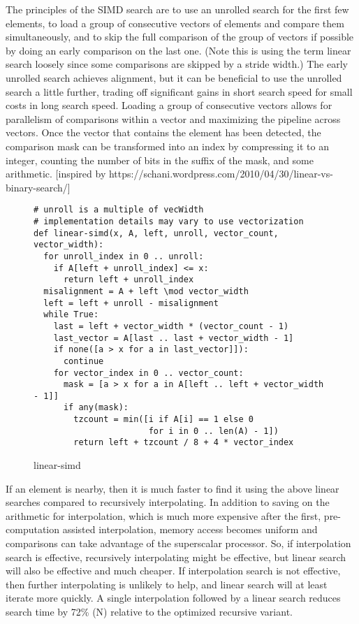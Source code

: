 \documentclass{article}
\begin{document}
The principles of the SIMD search are to use an unrolled search for the first few elements, to load a group of consecutive vectors of elements and compare them simultaneously, and to skip the full comparison of the group of vectors if possible by doing an early comparison on the last one. (Note this is using the term linear search loosely since some comparisons are skipped by a stride width.) The early unrolled search achieves alignment, but it can be beneficial to use the unrolled search a little further, trading off significant gains in short search speed for small costs in long search speed. Loading a group of consecutive vectors allows for parallelism of comparisons within a vector and maximizing the pipeline across vectors. Once the vector that contains the element has been detected, the comparison mask can be transformed into an index by compressing it to an integer, counting the number of bits in the suffix of the mask, and some arithmetic. [inspired by https://schani.wordpress.com/2010/04/30/linear-vs-binary-search/]

\begin{figure}
\begin{verbatim}
# unroll is a multiple of vecWidth
# implementation details may vary to use vectorization
def linear-simd(x, A, left, unroll, vector_count, vector_width):
  for unroll_index in 0 .. unroll:
    if A[left + unroll_index] <= x:
      return left + unroll_index
  misalignment = A + left \mod vector_width
  left = left + unroll - misalignment
  while True:
    last = left + vector_width * (vector_count - 1)
    last_vector = A[last .. last + vector_width - 1]
    if none([a > x for a in last_vector]]):
      continue
    for vector_index in 0 .. vector_count:
      mask = [a > x for a in A[left .. left + vector_width - 1]]
      if any(mask):
        tzcount = min([i if A[i] == 1 else 0
                       for i in 0 .. len(A) - 1])
        return left + tzcount / 8 + 4 * vector_index
\end{verbatim}
\caption{linear-simd}
\end{figure}

If an element is nearby, then it is much faster to find it using the above linear searches compared to recursively interpolating.  In addition to saving on the arithmetic for interpolation, which is much more expensive after the first, pre-computation assisted interpolation, memory access becomes uniform and comparisons can take advantage of the superscalar processor. So, if interpolation search is effective, recursively interpolating might be effective, but linear search will also be effective and much cheaper. If interpolation search is not effective, then further interpolating is unlikely to help, and linear search will at least iterate more quickly.  A single interpolation followed by a linear search reduces search time by 72\% (N) relative to the optimized recursive variant.
\end{document}
